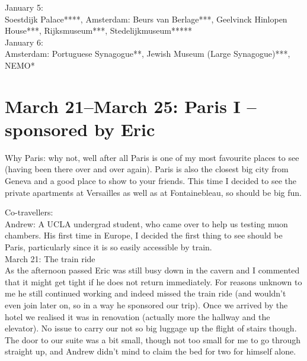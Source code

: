 January 5:\\
Soestdijk Palace****, Amsterdam: Beurs van Berlage***, Geelvinck Hinlopen House***, Rijksmuseum***, Stedelijkmuseum*****\\

January 6:\\
Amsterdam: Portuguese Synagogue**, Jewish Museum (Large Synagogue)***, NEMO*

\section{March 21--March 25: Paris I -- sponsored by Eric}
\label{2013:ParisI}

Why Paris: why not, well after all Paris is one of my most favourite places to see (having been there over and over again). Paris is also the closest big city from Geneva and a good place to show to your friends. This time I decided to see the private apartments at Versailles as well as at Fontainebleau, so should be big fun. 

Co-travellers:\\
Andrew: A UCLA undergrad student, who came over to help us testing muon chambers. His first time in Europe, I decided the first thing to see should be Paris, particularly since it is so easily accessible by train.\\

March 21: The train ride\\
As the afternoon passed Eric was still busy down in the cavern and I commented that it might get tight if he does not return immediately. For reasons unknown to me he still continued working and indeed missed the train ride (and wouldn't even join later on, so in a way he sponsored our trip). Once we arrived by the hotel we realised it was in renovation (actually more the hallway and the elevator). No issue to carry our not so big luggage up the flight of stairs though. The door to our suite was a bit small, though not too small for me to go through straight up, and Andrew didn't mind to claim the bed for two for himself alone.\\

